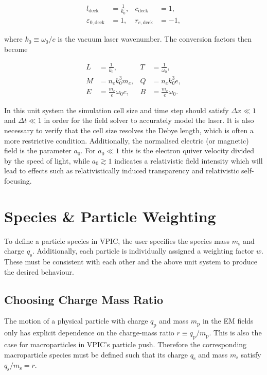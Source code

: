 \documentclass[twocolumn,10pt]{article}
\begin{document}
	\begin{align*}
		l_{\mathrm{deck}} &= \frac{1}{k_0}, &
		c_{\mathrm{deck}} &= 1, \\
		\varepsilon_{0,\mathrm{deck}} &= 1, &
		r_{e,\mathrm{deck}} &= -1,
	\end{align*}

	\noindent where $k_0 \equiv \omega_0/c$ is the vacuum laser wavenumber. The conversion factors then become

	\begin{align*}
		L &= \frac{1}{k_0}, &
		T &= \frac{1}{\omega_0}, \\
		M &= n_ek_0^3m_e, &
		Q &= n_ek_0^3e, \\
		E &= \frac{m_e}{e}\omega_0 c, &
		B &= \frac{m_e}{e}\omega_0.
	\end{align*}

	In this unit system the simulation cell size and time step should satisfy $\Delta x \ll 1$ and $\Delta t \ll 1$ in order for the field solver to accurately model the laser. It is also necessary to verify that the cell size resolves the Debye length, which is often a more restrictive condition. Additionally, the normalised electric (or magnetic) field is the parameter $a_0$. For $a_0 \ll 1$ this is the electron quiver velocity divided by the speed of light, while $a_0 \gtrsim 1$ indicates a relativistic field intensity which will lead to effects such as relativistically induced transparency and relativistic self-focusing.

	\section{Species \& Particle Weighting}

	To define a particle species in VPIC, the user specifies the species mass $m_{\mathrm{s}}$ and charge $q_{\mathrm{s}}$. Additionally, each particle is individually assigned a weighting factor $w$. These must be consistent with each other and the above unit system to produce the desired behaviour.

	\subsection{Choosing Charge Mass Ratio}

	The motion of a physical particle with charge $q_{\mathrm{p}}$ and mass $m_{\mathrm{p}}$ in the EM fields only has explicit dependence on the charge-mass ratio $r \equiv q_{\mathrm{p}}/m_{\mathrm{p}}$. This is also the case for macroparticles in VPIC's particle push. Therefore the corresponding macroparticle species must be defined such that its charge $q_{\mathrm{s}}$ and mass $m_{\mathrm{s}}$ satisfy $q_{\mathrm{s}}/m_{\mathrm{s}}=r$.
\end{document}
